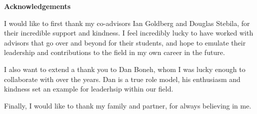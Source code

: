\cleardoublepage
{}    %

\begin{center}\textbf{Acknowledgements}\end{center}

I would like to first thank my co-advisors Ian Goldberg and Douglas Stebila,
for their incredible support and kindness.
I feel incredibly lucky to have worked with advisors that go over and beyond for their students,
and hope to emulate their leadership and contributions to the field in my own career in the future.

I also want to extend a thank you to Dan Boneh,
whom I was lucky enough to collaborate with over the years.
Dan is a true role model,
his enthusiasm and kindness set an example for leaderhsip within our field.

Finally, I would like to thank my family and partner,
for always believing in me.
\cleardoublepage
{}    %


\renewcommand\contentsname{Table of Contents}
\tableofcontents
\cleardoublepage
{}    %

\listoffigures
\cleardoublepage
{}		%

\listoftables
\cleardoublepage
{}		%

\renewcommand*{\abbreviationsname}{List of Abbreviations}
\printglossary[type=abbreviations]
\cleardoublepage
{}		%

\printglossary[type=symbols]
\cleardoublepage
{}		%



